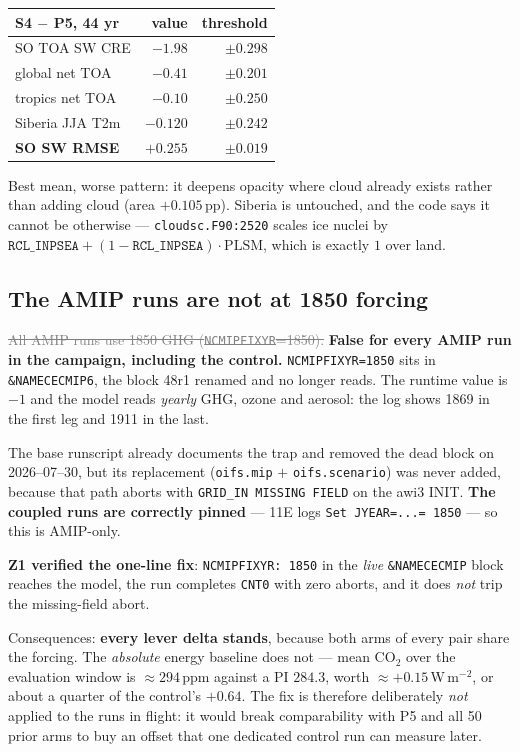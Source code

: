 \documentclass[10pt]{article}
\newcommand{\dead}[1]{\textcolor{gray}{\sout{#1}}}
\begin{document}
\begin{center}\footnotesize
\begin{tabular}{l r r}
\toprule
S4 $-$ P5, 44 yr & value & threshold \\
\midrule
SO TOA SW CRE & $-1.98$ & $\pm0.298$ \\
global net TOA & $-0.41$ & $\pm0.201$ \\
tropics net TOA & $-0.10$ & $\pm0.250$ \\
Siberia JJA T2m & $-0.120$ & $\pm0.242$ \\
\textbf{SO SW RMSE} & $\mathbf{+0.255}$ & $\pm0.019$ \\
\bottomrule
\end{tabular}
\end{center}

\noindent Best mean, worse pattern: it deepens opacity where cloud already exists rather
than adding cloud (area $+0.105$\,pp). Siberia is untouched, and the code says it cannot
be otherwise --- \texttt{cloudsc.F90:2520} scales ice nuclei by
$\mathtt{RCL\_INPSEA}+(1-\mathtt{RCL\_INPSEA})\cdot\mathrm{PLSM}$, which is exactly $1$
over land.

\subsection{The AMIP runs are not at 1850 forcing}\label{sub:r27forcing}
\dead{All AMIP runs use 1850 GHG (\texttt{NCMIPFIXYR}=1850).} \textbf{False for every AMIP
run in the campaign, including the control.} \texttt{NCMIPFIXYR=1850} sits in
\texttt{\&NAMECECMIP6}, the block 48r1 renamed and no longer reads. The runtime value is
$-1$ and the model reads \emph{yearly} GHG, ozone and aerosol: the log shows 1869 in the
first leg and 1911 in the last.

The base runscript already documents the trap and removed the dead block on 2026--07--30,
but its replacement (\texttt{oifs.mip} $+$ \texttt{oifs.scenario}) was never added, because
that path aborts with \texttt{GRID\_IN MISSING FIELD} on the awi3 INIT. \textbf{The coupled
runs are correctly pinned} --- 11E logs \texttt{Set JYEAR=...= 1850} --- so this is
AMIP-only.

\textbf{Z1 verified the one-line fix}: \texttt{NCMIPFIXYR: 1850} in the \emph{live}
\texttt{\&NAMECECMIP} block reaches the model, the run completes \texttt{CNT0} with zero
aborts, and it does \emph{not} trip the missing-field abort.

Consequences: \textbf{every lever delta stands}, because both arms of every pair share the
forcing. The \emph{absolute} energy baseline does not --- mean CO$_2$ over the evaluation
window is ${\approx}294$\,ppm against a PI $284.3$, worth ${\approx}+0.15$\,W\,m$^{-2}$, or
about a quarter of the control's $+0.64$. The fix is therefore deliberately \emph{not}
applied to the runs in flight: it would break comparability with P5 and all 50 prior arms
to buy an offset that one dedicated control run can measure later.
\end{document}
